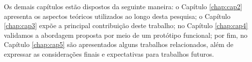 %
%
%
%


Os demais capítulos estão dispostos da seguinte maneira: o Capítulo \ref{chap:cap2} apresenta os aspectos teóricos utilizados ao longo desta pesquisa; o Capítulo \ref{chap:cap3} expõe a principal contribuição deste trabalho; no Capítulo \ref{chap:cap4} validamos a abordagem proposta por meio de um protótipo funcional; por fim, no Capítulo \ref{chap:cap5} são apresentados alguns trabalhos relacionados, além de expressar as considerações finais e expectativas para trabalhos futuros.